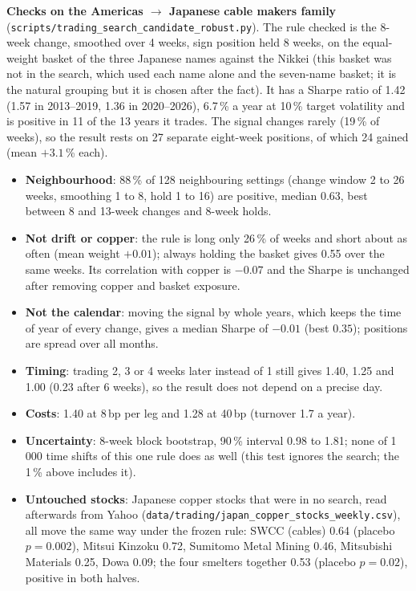 \documentclass[10pt,a4paper]{article}
\begin{document}
\textbf{Checks on the Americas $\rightarrow$ Japanese cable makers family} (\texttt{scripts/trading\_search\_candidate\_robust.py}). The rule checked is the 8-week change, smoothed over 4 weeks, sign position held 8 weeks, on the equal-weight basket of the three Japanese names against the Nikkei (this basket was not in the search, which used each name alone and the seven-name basket; it is the natural grouping but it is chosen after the fact). It has a Sharpe ratio of 1.42 (1.57 in 2013--2019, 1.36 in 2020--2026), 6.7\,\% a year at 10\,\% target volatility and is positive in 11 of the 13 years it trades. The signal changes rarely (19\,\% of weeks), so the result rests on 27 separate eight-week positions, of which 24 gained (mean $+3.1$\,\% each).
\begin{itemize}
\item \textbf{Neighbourhood}: 88\,\% of 128 neighbouring settings (change window 2 to 26 weeks, smoothing 1 to 8, hold 1 to 16) are positive, median 0.63, best between 8 and 13-week changes and 8-week holds.
\item \textbf{Not drift or copper}: the rule is long only 26\,\% of weeks and short about as often (mean weight $+0.01$); always holding the basket gives 0.55 over the same weeks. Its correlation with copper is $-0.07$ and the Sharpe is unchanged after removing copper and basket exposure.
\item \textbf{Not the calendar}: moving the signal by whole years, which keeps the time of year of every change, gives a median Sharpe of $-0.01$ (best $0.35$); positions are spread over all months.
\item \textbf{Timing}: trading 2, 3 or 4 weeks later instead of 1 still gives 1.40, 1.25 and 1.00 (0.23 after 6 weeks), so the result does not depend on a precise day.
\item \textbf{Costs}: 1.40 at 8\,bp per leg and 1.28 at 40\,bp (turnover 1.7 a year).
\item \textbf{Uncertainty}: 8-week block bootstrap, 90\,\% interval 0.98 to 1.81; none of 1\,000 time shifts of this one rule does as well (this test ignores the search; the 1\,\% above includes it).
\item \textbf{Untouched stocks}: Japanese copper stocks that were in no search, read afterwards from Yahoo (\texttt{data/trading/japan\_copper\_stocks\_weekly.csv}), all move the same way under the frozen rule: SWCC (cables) 0.64 (placebo $p=0.002$), Mitsui Kinzoku 0.72, Sumitomo Metal Mining 0.46, Mitsubishi Materials 0.25, Dowa 0.09; the four smelters together 0.53 (placebo $p=0.02$), positive in both halves.

\end{itemize}
\end{document}
